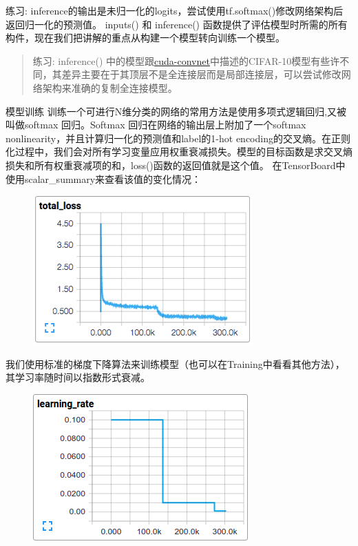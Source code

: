 \documentclass[11pt,fleqn]{book}
\begin{document}
{\begin{figure}[H]
\end{figure}
练习: inference的输出是未归一化的logits，尝试使用tf.softmax()修改网络架构后返回归一化的预测值。
inputs() 和 inference() 函数提供了评估模型时所需的所有构件，现在我们把讲解的重点从构建一个模型转向训练一个模型。
\begin{quote}
练习: inference() 中的模型跟\href{https://code.google.com/p/cuda-convnet/}{cuda-convnet}中描述的CIFAR-10模型有些许不同，其差异主要在于其顶层不是全连接层而是局部连接层，可以尝试修改网络架构来准确的复制全连接模型。
\end{quote}
模型训练
训练一个可进行N维分类的网络的常用方法是使用多项式逻辑回归,又被叫做softmax 回归。Softmax 回归在网络的输出层上附加了一个softmax nonlinearity，并且计算归一化的预测值和label的1-hot encoding的交叉熵。在正则化过程中，我们会对所有学习变量应用权重衰减损失。模型的目标函数是求交叉熵损失和所有权重衰减项的和，loss()函数的返回值就是这个值。
在TensorBoard中使用scalar\_summary来查看该值的变化情况：
\begin{figure}[H]
\centering
\includegraphics[scale=0.5]{cifar_loss.png}
\end{figure}
我们使用标准的梯度下降算法来训练模型（也可以在Training中看看其他方法），其学习率随时间以指数形式衰减。
\begin{figure}[H]
\centering
\includegraphics[scale=0.5]{cifar_lr_decay.png}
\end{figure}
}
\end{document}
